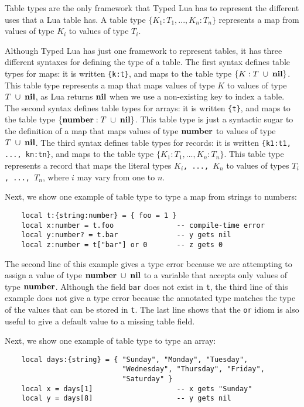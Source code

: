 Table types are the only framework that Typed Lua has to represent
the different uses that a Lua table has.
A table type $\{K_{1}:T_{1}, ..., K_{n}:T_{n}\}$ represents a map
from values of type $K_{i}$ to values of type $T_{i}$.

Although Typed Lua has just one framework to represent tables,
it has three different syntaxes for defining the type of a table.
The first syntax defines table types for maps:
it is written \texttt{\{k:t\}},
and maps to the table type $\{K:T\;\cup\;\mathbf{nil}\}$.
This table type represents a map that maps values of type
$K$ to values of type $T\;\cup\;\mathbf{nil}$,
as Lua returns $\mathbf{nil}$ when we use a non-existing key to index a table.
The second syntax defines table types for arrays:
it is written \texttt{\{t\}},
and maps to the table type $\{\mathbf{number}:T\;\cup\;\mathbf{nil}\}$.
This table type is just a syntactic sugar to the definition of a
map that maps values of type $\mathbf{number}$ to values of type $T\;\cup\;\mathbf{nil}$.
The third syntax defines table types for records:
it is written \texttt{\{k1:t1, ..., kn:tn\}},
and maps to the table type $\{K_{1}:T_{1}, ..., K_{n}:T_{n}\}$.
This table type represents a record that maps the literal types
$K_{i}$\texttt{, ..., }$K_{n}$ to values of types
$T_{i}$\texttt{, ..., }$T_{n}$, where $i$ may vary from one to $n$.

Next, we show one example of table type to type a map from strings to numbers:
\begin{verbatim}
    local t:{string:number} = { foo = 1 } 
    local x:number = t.foo               -- compile-time error
    local y:number? = t.bar              -- y gets nil
    local z:number = t["bar"] or 0       -- z gets 0 
\end{verbatim}

The second line of this example gives a type error because we are
attempting to assign a value of type $\mathbf{number}\;\cup\;\mathbf{nil}$ to a
variable that accepts only values of type $\mathbf{number}$.
Although the field \texttt{bar} does not exist in \texttt{t}, the third
line of this example does not give a type error because the
annotated type matches the type of the values that can be stored in
\texttt{t}.
The last line shows that the \texttt{or} idiom is also useful to
give a default value to a missing table field.

Next, we show one example of table type to type an array:
\begin{verbatim}
    local days:{string} = { "Sunday", "Monday", "Tuesday",
                            "Wednesday", "Thursday", "Friday",
                            "Saturday" }
    local x = days[1]                    -- x gets "Sunday"
    local y = days[8]                    -- y gets nil
\end{verbatim}

